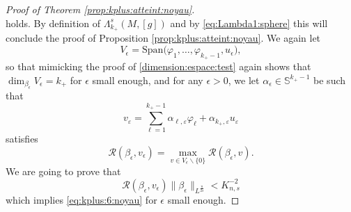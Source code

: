 \documentclass[10pt]{amsart}
\numberwithin{equation}{section}
\def\be{{\beta}}
\def\ep{{\varepsilon}}
\newcommand{\ve}{\varepsilon}
\newcommand{\vp}{\varphi}
\def \rr {\mathbb{R}}
\def \ep{\epsilon}
\theoremstyle{plain}
\theoremstyle{remark}
\begin{document}
\begin{proof}[Proof of Theorem \ref{prop:kplus:atteint:noyau}]
\begin{equation}
\end{equation}
holds. By definition of $\Lambda_{k_+}^{s}(M,[g])$ and by \eqref{eq:Lambda1:sphere} this will conclude the proof of Proposition  \ref{prop:kplus:atteint:noyau}. We again let 
$$ V_\ep = \text{Span} \big( \vp_{1}, \dots, \vp_{k_+-1}, u_\ep\big), $$
so that mimicking the proof of \eqref{dimension:espace:test} again shows that $\dim_{\beta_\ep} V_\ep = k_+$ for $\ep$ small enough, and for any $\ep >0$, we let $\alpha_\ep \in \mathbb{S}^{k_+-1}$ be such that 
 \begin{equation*} %
 	v_\ve=\sum_{\ell=1}^{k_+-1}\alpha_{\ell,\ve} \varphi_{\ell}+\alpha_{k_+,\ve}u_{\ve}
 \end{equation*}
satisfies
 \begin{equation*} %
 	\mathcal{R}(\beta_\ep, v_\ep) = \max_{v \in V_\ep \backslash \{0\}} \mathcal{R}(\beta_\ep, v). 
	\end{equation*}
We are going to prove that 
 \begin{equation}\label{eq:kplus:71:noyau}
 	\mathcal{R}(\beta_\ep, v_\ep) \|\be_\ep\|_{L^{\frac{n}{2s}}} < K_{n,s}^{-2}%
	\end{equation}
which implies \eqref{eq:kplus:6:noyau} for $\ep$ small enough. 

\medskip




\end{proof}
\end{document}
